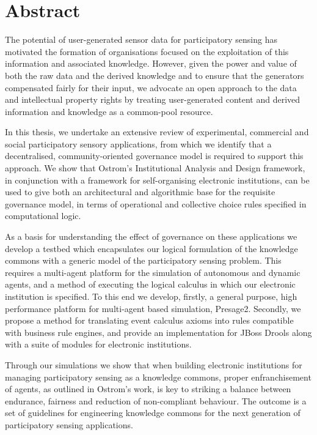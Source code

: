 \begingroup
\let\clearpage\relax
\let\cleardoublepage\relax
\let\cleardoublepage\relax

\chapter*{Abstract}

The potential of user-generated sensor data for participatory sensing has motivated the formation of organisations focused on the exploitation of this information and associated knowledge. 
However, given the power and value of both the raw data and the derived knowledge and to ensure that the
generators compensated fairly for their input, we advocate an open approach to the data and intellectual
property rights by treating user-generated content and derived information and knowledge 
as a common-pool resource.

In this thesis, we undertake an extensive review of experimental, commercial and social participatory sensory applications, from which we identify that a decentralised, community-oriented governance model is required
to support this approach. We show that Ostrom's Institutional Analysis and Design framework, in conjunction
with a framework for self-organising electronic institutions, can be used to give both an architectural
and algorithmic base for the requisite governance model, in terms of operational and collective choice rules
specified in computational logic.

As a basis for understanding the effect of governance on these applications we develop a testbed which encapsulates our logical formulation of the knowledge commons with a generic model of the participatory sensing problem.
This requires a multi-agent platform for the simulation of autonomous and dynamic agents, and a method of executing the logical calculus in which our electronic institution is specified. 
To this end we develop, firstly, a general purpose, high performance platform for multi-agent based simulation, Presage2. 
Secondly, we propose a method for translating event calculus axioms into rules compatible with business rule engines, and provide an implementation for JBoss Drools along with a suite of modules for electronic institutions.

Through our simulations we show that when building electronic institutions for managing participatory sensing as a knowledge commons, proper enfranchisement of agents, as outlined in Ostrom's work, is key to striking a balance between endurance, fairness and reduction of non-compliant behaviour. The outcome is a set of guidelines for engineering knowledge commons for the next generation of participatory sensing applications.

